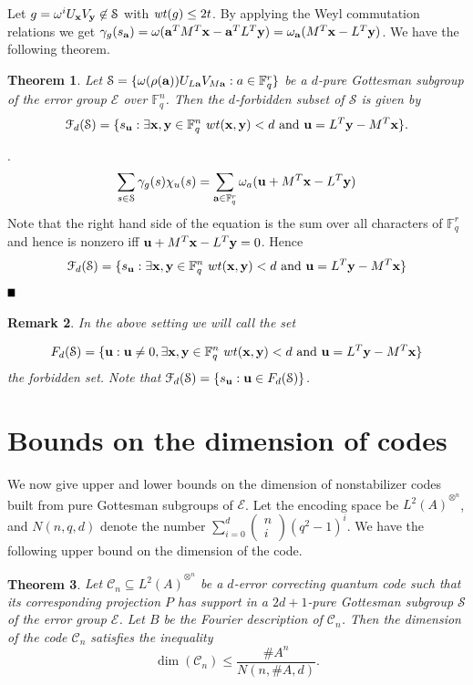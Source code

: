 \documentclass{Rinton-P9x6}
\newtheorem{theorem}{Theorem}[section]
\newtheorem{remark}[theorem]{Remark}
\newcommand{\GF}[2][]{{\ensuremath{\mathbb{F}_{#2}^{#1}}}}
\newcommand{\bproof}{\noindent{\it Proof}}
\newcommand{\eproof}{\hspace*{\fill}$\rule{2mm}{2mm}$~~~~~\bigskip}
\renewenvironment{proof}{\bproof. }{\eproof}
\renewcommand{\a}{{\bf a}}
\newcommand{\x}{{\bf x}}
\renewcommand{\u}{{\bf u}}
\newcommand{\y}{{\bf y}}
\newcommand{\om}{{\omega}}
\newcommand{\wt}{{\it wt}}
\newcommand{\C}{{\ensuremath{\mathcal{C}}}}
\renewcommand{\S}{{\ensuremath{\mathcal{S}}}}
\newcommand{\HinA}{{\ensuremath{{L^2(A)}^{\otimes^n}}}}
\newcommand{\E}{{\ensuremath{\mathcal{E}}}}
\begin{document}
Let $g =\om^i U_\x V_\y\not\in\S$ with $\wt(g)\leq 2t$. By applying
the Weyl commutation relations we get $\gamma_g(s_{\a})=
\omega(\a^{T}M^T \x - \a^{T}L^{T}\y) = \omega_\a( M^T \x - L^T \y)$.
We have the following theorem.

\begin{theorem}\label{forbiddensettheorem}
  Let $\S = \{ \omega(\rho(\a)) U_{L\a} V_{M\a} : a \in \GF[r]{q} \}$
  be a $d$-pure Gottesman subgroup of the error group $\E$ over
  $\GF[n]{q}$. Then the $d$-forbidden subset of $\S$ is given by
  \[
  \mathcal{F}_d(\S) = \{ s_{\bf u}: \exists \x,\y \in \GF[n]{q}\ wt(\x,\y) < d
  \textrm{ and } {\bf u} = L^T \y - M^T \x \}.
  \]
\end{theorem}
\begin{proof}
  \[
  \sum_{s \in \S} \gamma_g(s) \chi_u(s) = \sum_{\a \in \GF[r]{q}}
  \omega_a({\bf u } + M^T \x - L^T \y)
  \]
  Note that the right hand side of the equation is the sum over all
  characters of $\GF[r]{q}$ and hence is nonzero iff $ {\bf u} + M^T \x
  - L^T \y= 0$. Hence
  \[
  \mathcal{F}_d(\S) = \{ s_{\bf u}: \exists \x,\y \in \GF[n]{q}\ wt(\x,\y) < d
  \textrm{ and } {\bf u} =L^T\y -  M^T \x  \}
  \]
\end{proof}

\begin{remark}\label{forbiddensetremark}
  In the above setting we will call the set 
  
  \[
  F_d(\S) = \{\u: \u\neq 0, \exists \x,\y \in \GF[n]{q}\ wt(\x,\y) < d
  \textrm{ and } {\bf u} = L^T \y - M^T \x \}
  \] 
  the forbidden set. Note that $\mathcal{F}_d(\S) = \{ s_{\bf u} : {
    \bf u } \in F_d(\S)\}$.
\end{remark}

\section{Bounds on the dimension of codes}

We now give upper and lower bounds on the dimension of nonstabilizer
codes built from pure Gottesman subgroups of $\E$. Let the encoding
space be $\HinA$, and $N(n,q,d)$ denote the number $\sum_{i=0}^{d}
{\left( \begin{array}{c} n \\ i \end{array} \right)} (q^2 -1)^i$. 
We have the following upper bound on the dimension of the code.

\begin{theorem}
  Let $\C_n\subseteq\HinA$ be a $d$-error correcting quantum code such
  that its corresponding projection $P$ has support in a $2d+1$-pure
  Gottesman subgroup $\S$ of the error group $\E$. Let $B$ be the 
  Fourier description of $\C_n$. Then the dimension of the code $\C_n$
  satisfies the inequality 
\[ 
\dim(\C_n) \leq \frac{\#A^n}{N\left(n,\#A,d\right)}. 
\]
\end{theorem}
\end{document}
